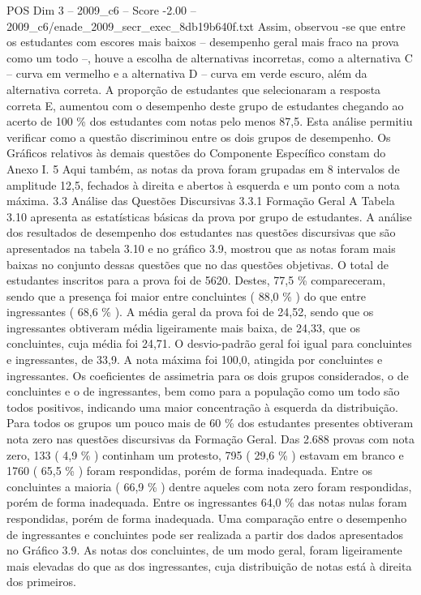 \begin{textsample}{POS Dim 3 – 2009\_c6 – Score -2.00 – 2009\_c6/enade\_2009\_secr\_exec\_8db19b640f.txt}
Assim, observou -se que entre os estudantes com escores mais baixos – desempenho geral mais fraco na prova como um todo –, houve a escolha de alternativas incorretas, como a alternativa C – curva em vermelho e a alternativa D – curva em verde escuro, além da alternativa correta.
A proporção de estudantes que selecionaram a resposta correta E, aumentou com o desempenho deste grupo de estudantes chegando ao acerto de 100 \% dos estudantes com notas pelo menos 87,5.
Esta análise permitiu verificar como a questão discriminou entre os dois grupos de desempenho.
Os Gráficos relativos às demais questões do Componente Específico constam do Anexo I. 5 Aqui também, as notas da prova foram grupadas em 8 intervalos de amplitude 12,5, fechados à direita e abertos à esquerda e um ponto com a nota máxima. 3.3 Análise das Questões Discursivas 3.3.1 Formação Geral A Tabela 3.10 apresenta as estatísticas básicas da prova por grupo de estudantes.
A análise dos resultados de desempenho dos estudantes nas questões discursivas que são apresentados na tabela 3.10 e no gráfico 3.9, mostrou que as notas foram mais baixas no conjunto dessas questões que no das questões objetivas.
O total de estudantes inscritos para a prova foi de 5620.
Destes, 77,5 \% compareceram, sendo que a presença foi maior entre concluintes ( 88,0 \% ) do que entre ingressantes ( 68,6 \% ).
A média geral da prova foi de 24,52, sendo que os ingressantes obtiveram média ligeiramente mais baixa, de 24,33, que os concluintes, cuja média foi 24,71.
O desvio-padrão geral foi igual para concluintes e ingressantes, de 33,9.
A nota máxima foi 100,0, atingida por concluintes e ingressantes.
Os coeficientes de assimetria para os dois grupos considerados, o de concluintes e o de ingressantes, bem como para a população como um todo são todos positivos, indicando uma maior concentração à esquerda da distribuição.
Para todos os grupos um pouco mais de 60 \% dos estudantes presentes obtiveram nota zero nas questões discursivas da Formação Geral.
Das 2.688 provas com nota zero, 133 ( 4,9 \% ) continham um protesto, 795 ( 29,6 \% ) estavam em branco e 1760 ( 65,5 \% ) foram respondidas, porém de forma inadequada.
Entre os concluintes a maioria ( 66,9 \% ) dentre aqueles com nota zero foram respondidas, porém de forma inadequada.
Entre os ingressantes 64,0 \% das notas nulas foram respondidas, porém de forma inadequada.
Uma comparação entre o desempenho de ingressantes e concluintes pode ser realizada a partir dos dados apresentados no Gráfico 3.9.
As notas dos concluintes, de um modo geral, foram ligeiramente mais elevadas do que as dos ingressantes, cuja distribuição de notas está à direita dos primeiros.

\end{textsample}
